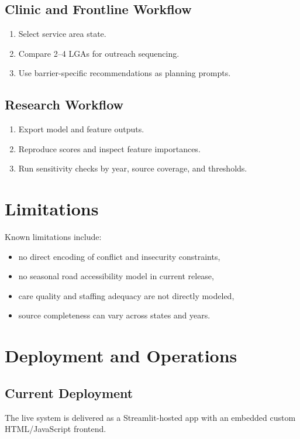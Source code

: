 \documentclass[11pt]{article}
\begin{document}
\subsection{Clinic and Frontline Workflow}
\begin{enumerate}[leftmargin=1.5em]
  \item Select service area state.
  \item Compare 2--4 LGAs for outreach sequencing.
  \item Use barrier-specific recommendations as planning prompts.
\end{enumerate}

\subsection{Research Workflow}
\begin{enumerate}[leftmargin=1.5em]
  \item Export model and feature outputs.
  \item Reproduce scores and inspect feature importances.
  \item Run sensitivity checks by year, source coverage, and thresholds.
\end{enumerate}

\section{Limitations}
Known limitations include:
\begin{itemize}[leftmargin=1.5em]
  \item no direct encoding of conflict and insecurity constraints,
  \item no seasonal road accessibility model in current release,
  \item care quality and staffing adequacy are not directly modeled,
  \item source completeness can vary across states and years.
\end{itemize}

\section{Deployment and Operations}
\subsection{Current Deployment}
The live system is delivered as a Streamlit-hosted app with an embedded custom HTML/JavaScript frontend.
\end{document}
